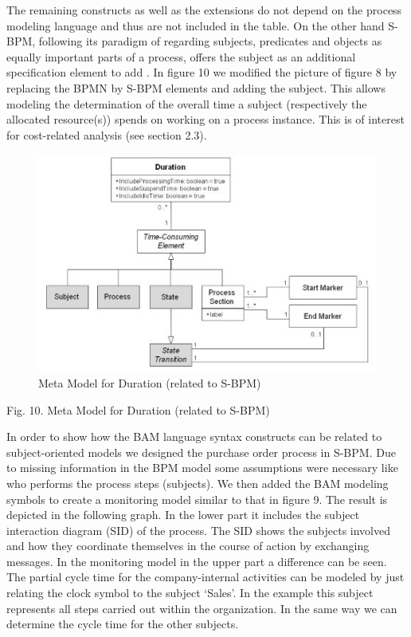 The remaining constructs as well as the extensions do not depend on the process modeling language and thus are not included in the table.
On the other hand S-BPM, following its paradigm of regarding subjects, predicates and objects as equally important parts of a process, offers the subject as an additional specification element to add . In figure 10 we modified the picture of figure 8 by replacing the BPMN by S-BPM elements and adding the subject. This allows modeling the determination of the overall time a subject (respectively the allocated resource(s)) spends on working on a process instance. This is of interest for cost-related analysis (see section 2.3).

\begin{figure}[h]
	\centering
	\includegraphics[width=0.9\linewidth]{Figures/Chapter5/Meta-Mode-fo-Duration-relate- to-SBPM.jpg}
	\caption[Meta Model for Duration (related to S-BPM)]{Meta Model for Duration (related to S-BPM)}
	\label{fig:Meta-Model-S_BPM}
\end{figure}



Fig. 10. Meta Model for Duration (related to S-BPM)

In order to show how the BAM language syntax constructs can be related to subject-oriented models we designed the purchase order process in S-BPM. Due to missing information in the BPM model some assumptions were necessary like who performs the process steps (subjects). We then added the BAM modeling symbols to create a monitoring model similar to that in figure 9.
The result is depicted in the following graph. In the lower part it includes the subject interaction diagram (SID) of the process. The SID shows the subjects involved and how they coordinate themselves in the course of action by exchanging messages. In the monitoring model in the upper part a difference can be seen. The partial cycle time for the company-internal activities can be modeled by just relating the clock symbol to the subject ‘Sales’. In the example this subject represents all steps carried out within the organization. In the same way we can determine the cycle time for the other subjects.

